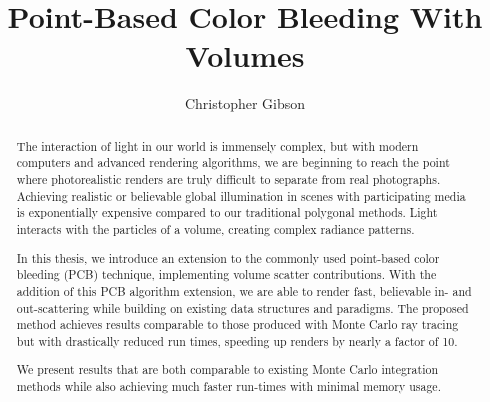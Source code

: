 \documentclass[12pt]{ucthesis}
\begin{document}

\title{Point-Based Color Bleeding With Volumes}
\author{Christopher Gibson}
  
 
     



\maketitle

\begin{frontmatter}

\copyrightpage

\committeemembershippage

\begin{abstract}

The interaction of light in our world is immensely complex, but with modern computers and advanced rendering algorithms, we are beginning to reach the point where photorealistic renders are truly difficult to separate from real photographs.  Achieving realistic or believable global illumination in scenes with participating media is exponentially expensive compared to our traditional polygonal methods.  Light interacts with the particles of a volume, creating complex radiance patterns.

In this thesis, we introduce an extension to the commonly used point-based color bleeding (PCB) technique, implementing volume scatter contributions.  With the addition of this PCB algorithm extension, we are able to render fast, believable in- and out-scattering while building on existing data structures and paradigms.  The proposed method achieves results comparable to those produced with Monte Carlo ray tracing but with drastically reduced run times, speeding up renders by nearly a factor of 10.

We present results that are both comparable to existing Monte Carlo integration methods while also achieving much faster run-times with minimal memory usage.

\end{abstract}





\tableofcontents


\listoftables

\listoffigures

\end{frontmatter}
\end{document}
